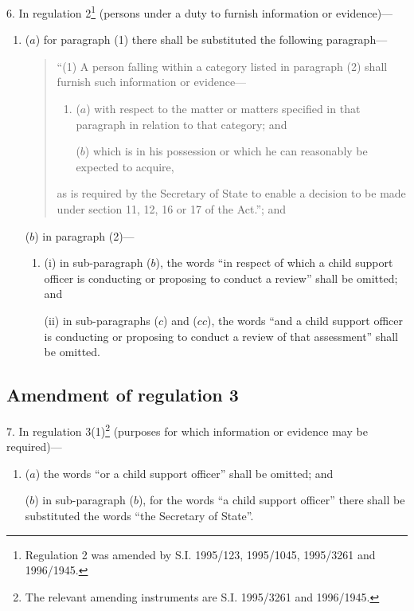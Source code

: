 \documentclass[12pt,a4paper]{article}
\begin{document}
6.  In regulation 2\footnote{\frenchspacing Regulation 2 was amended by S.I. 1995/123, 1995/1045, 1995/3261 and 1996/1945.} (persons under a duty to furnish information or evidence)—
\begin{enumerate}\item[]
($a$) for paragraph (1) there shall be substituted the following paragraph—
\begin{quotation}
“(1) A person falling within a category listed in paragraph (2) shall furnish such information or evidence—
\begin{enumerate}\item[]
($a$) with respect to the matter or matters specified in that paragraph in relation to that category; and

($b$) which is in his possession or which he can reasonably be expected to acquire,
\end{enumerate}
as is required by the Secretary of State to enable a decision to be made under section 11, 12, 16 or 17 of the Act.”; and
\end{quotation}

($b$) in paragraph (2)—
\begin{enumerate}\item[]
(i) in sub-paragraph ($b$), the words “in respect of which a child support officer is conducting or proposing to conduct a review” shall be omitted; and

(ii) in sub-paragraphs ($c$) and ($cc$), the words “and a child support officer is conducting or proposing to conduct a review of that assessment” shall be omitted.
\end{enumerate}
\end{enumerate}

\subsection[7. Amendment of regulation 3]{Amendment of regulation 3}

7.  In regulation 3(1)\footnote{\frenchspacing The relevant amending instruments are S.I. 1995/3261 and 1996/1945.} (purposes for which information or evidence may be required)—
\begin{enumerate}\item[]
($a$) the words “or a child support officer” shall be omitted; and

($b$) in sub-paragraph ($b$), for the words “a child support officer” there shall be substituted the words “the Secretary of State”.
\end{enumerate}
\end{document}
